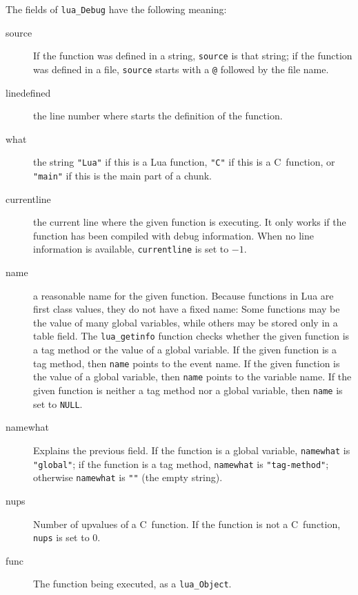 \documentclass[11pt]{article}
\newcommand{\Math}[1]{$#1$}
\begin{document}
The fields of \verb|lua_Debug| have the following meaning:
\begin{description}

\item[source]
If the function was defined in a string,
\verb|source| is that string;
if the function was defined in a file,
\verb|source| starts with a \verb|@| followed by the file name.

\item[linedefined]
the line number where starts the definition of the function.

\item[what] the string \verb|"Lua"| if this is a Lua function,
\verb|"C"| if this is a C~function,
or \verb|"main"| if this is the main part of a chunk.

\item[currentline]
the current line where the given function is executing.
It only works if the function has been compiled with debug
information.
When no line information is available,
\verb|currentline| is set to \Math{-1}.

\item[name]
a reasonable name for the given function.
Because functions in Lua are first class values,
they do not have a fixed name:
Some functions may be the value of many global variables,
while others may be stored only in a table field.
The \verb|lua_getinfo| function checks whether the given
function is a tag method or the value of a global variable.
If the given function is a tag method,
then \verb|name| points to the event name.
If the given function is the value of a global variable,
then \verb|name| points to the variable name.
If the given function is neither a tag method nor a global variable,
then \verb|name| is set to \verb|NULL|.

\item[namewhat]
Explains the previous field.
If the function is a global variable,
\verb|namewhat| is \verb|"global"|;
if the function is a tag method,
\verb|namewhat| is \verb|"tag-method"|;
otherwise \verb|namewhat| is \verb|""| (the empty string).

\item[nups]
Number of upvalues of a C~function.
If the function is not a C~function,
\verb|nups| is set to 0.

\item[func]
The function being executed, as a \verb|lua_Object|.

\end{description}
\end{document}

